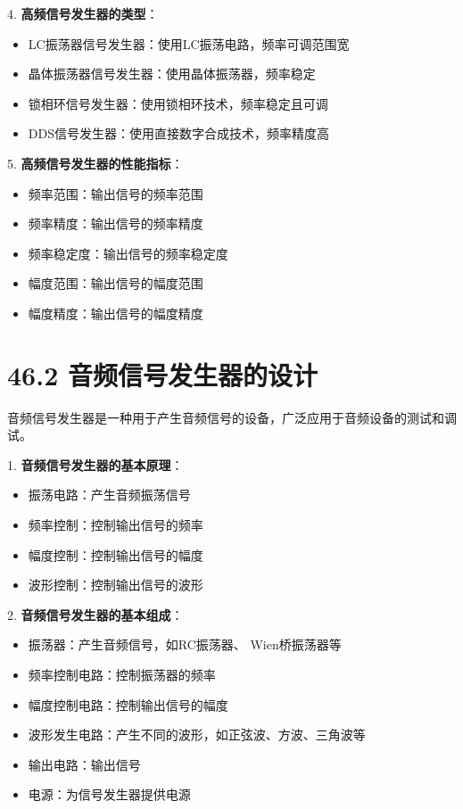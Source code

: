 \documentclass[12pt,UTF8]{ctexbook}
\begin{document}
4. \textbf{高频信号发生器的类型}：
   \begin{itemize}[leftmargin=3.5em]
   \item LC振荡器信号发生器：使用LC振荡电路，频率可调范围宽
   \item 晶体振荡器信号发生器：使用晶体振荡器，频率稳定
   \item 锁相环信号发生器：使用锁相环技术，频率稳定且可调
   \item DDS信号发生器：使用直接数字合成技术，频率精度高
   \end{itemize}

5. \textbf{高频信号发生器的性能指标}：
   \begin{itemize}[leftmargin=3.5em]
   \item 频率范围：输出信号的频率范围
   \item 频率精度：输出信号的频率精度
   \item 频率稳定度：输出信号的频率稳定度
   \item 幅度范围：输出信号的幅度范围
   \item 幅度精度：输出信号的幅度精度
   \end{itemize}

\section*{46.2 音频信号发生器的设计}

音频信号发生器是一种用于产生音频信号的设备，广泛应用于音频设备的测试和调试。

1. \textbf{音频信号发生器的基本原理}：
   \begin{itemize}[leftmargin=3.5em]
   \item 振荡电路：产生音频振荡信号
   \item 频率控制：控制输出信号的频率
   \item 幅度控制：控制输出信号的幅度
   \item 波形控制：控制输出信号的波形
   \end{itemize}

2. \textbf{音频信号发生器的基本组成}：
   \begin{itemize}[leftmargin=3.5em]
   \item 振荡器：产生音频信号，如RC振荡器、 Wien桥振荡器等
   \item 频率控制电路：控制振荡器的频率
   \item 幅度控制电路：控制输出信号的幅度
   \item 波形发生电路：产生不同的波形，如正弦波、方波、三角波等
   \item 输出电路：输出信号
   \item 电源：为信号发生器提供电源
   \end{itemize}
\end{document}
